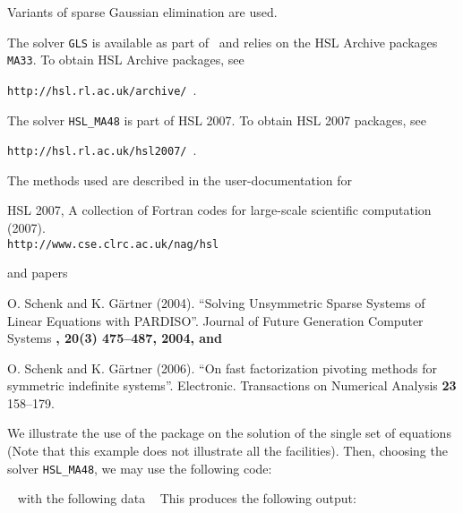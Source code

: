 \documentclass{galahad}
\begin{document}

\galmethod
Variants of sparse Gaussian elimination are used. 

\noindent
The solver {\tt GLS} is available as part of \galahad\ and relies on 
the HSL Archive packages {\tt MA33}. To obtain HSL Archive packages, see

{\tt http://hsl.rl.ac.uk/archive/ }.

\noindent
The solver {\tt HSL\_MA48}
is part of HSL 2007. 
To obtain HSL 2007 packages, see

{\tt http://hsl.rl.ac.uk/hsl2007/ }.



\vspace*{1mm}

\galreferences
\vspace*{1mm}

\noindent
The methods used are described in the user-documentation for
\vspace*{1mm}

\noindent
HSL 2007, A collection of {F}ortran codes for large-scale scientific
 computation (2007). \\
 {\tt http://www.cse.clrc.ac.uk/nag/hsl}

\noindent
and papers

\noindent
O. Schenk and K. G\"{a}rtner (2004).
``Solving Unsymmetric Sparse Systems of Linear Equations with PARDISO''. 
Journal of Future Generation Computer Systems \bf, 20(3) \rm 475--487, 2004,
and

\noindent
O. Schenk and K. G\"{a}rtner (2006). 
``On fast factorization pivoting methods for symmetric indefinite systems''.
Electronic. Transactions on Numerical Analysis
{\bf 23} 158--179.


\galexample
We illustrate the use of the package on the solution of the 
single set of equations 
(Note that this example does not illustrate all the facilities). 
Then, choosing the solver {\tt HSL\_MA48}, we may use the following code:

{\tt \small
\VerbatimInput{\packageexample}
}
\noindent
with the following data
{\tt \small
\VerbatimInput{\packagedata}
}
\noindent
This produces the following output:
{\tt \small
\VerbatimInput{\packageresults}
}
\noindent
\end{document}
